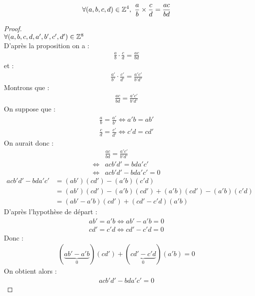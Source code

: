 \begin{graybox}
	\begin{proposition}
		\begin{align*}
			\forall (a, b, c, d) \in \mathbb{Z}^4,\ \frac{a}{b} \times \frac{c}{d} = \frac{ac}{bd}	
		\end{align*}
	\end{proposition}
\end{graybox}

\begin{proof}~
	\\
	$\forall (a, b, c, d, a', b', c', d') \in \mathbb{Z}^8$\\
	D'après la proposition on a :
	\begin{align*}
		\frac{a}{b} \cdot \frac{c}{d} = \frac{ac}{bd}
	\end{align*}
	et :
	\begin{align*}
		\frac{a'}{b'} \cdot \frac{c'}{d'} = \frac{a'c'}{b'd'}
	\end{align*}
	Montrons que :
	\begin{align*}
		\frac{ac}{bd} = \frac{a'c'}{b'd'}
	\end{align*}
	On suppose que : 
	\begin{align*}
		\frac{a}{b} = \frac{a'}{b'} \iff a'b = ab' \\
		\frac{c}{d} = \frac{c'}{d'} \iff c'd = cd'
	\end{align*}
	On aurait donc :
	\begin{align*}
		&\frac{ac}{bd} = \frac{a'c'}{b'd'} \\
		\iff &acb'd' = bda'c' \\
		\iff &acb'd' - bda'c' = 0
	\end{align*}
	\begin{align*}
		acb'd' - bda'c' &= (ab')(cd') - (a'b)(c'd) \\
		&= (ab')(cd') - (a'b)(cd') + (a'b)(cd') - (a'b)(c'd) \\
		&= (ab' - a'b)(cd') + (cd' - c'd)(a'b)
	\end{align*}
	D'après l'hypothèse de départ :
	\begin{align*}
		ab' = a'b \iff ab' - a'b = 0 \\
		cd' = c'd \iff cd' - c'd = 0
	\end{align*}
	Donc :
	\begin{align*}
		(\underbrace{ab' - a'b}_0)(cd') + (\underbrace{cd' - c'd}_0)(a'b) = 0
	\end{align*}
	On obtient alors :
	\begin{align*}
		acb'd' - bda'c' = 0
	\end{align*}
\end{proof}
